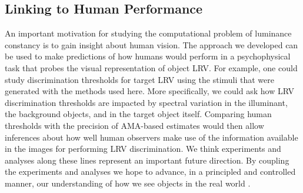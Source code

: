 \documentclass{jov}
\begin{document}
\subsection{Linking to Human Performance}

An important motivation for studying the computational problem of luminance constancy
is to gain insight about human vision.
The approach we developed can be used to make predictions of how humans would perform in a psychophysical task that probes the visual representation of object LRV.
For example, one could study discrimination thresholds for target LRV using the stimuli that were generated with the methods used here.
More specifically, we could ask how LRV discrimination thresholds are impacted by spectral variation in the illuminant, the background objects, and in the target object itself.
Comparing human thresholds with the precision of AMA-based estimates would then allow inferences about how well human observers make use of the information available in the images for performing LRV discrimination.
We think experiments and analyses along these lines represent an important future direction.
By coupling the experiments and analyses we hope to advance, in a principled and controlled manner, our understanding of how we see objects in the real world .



\end{document}
